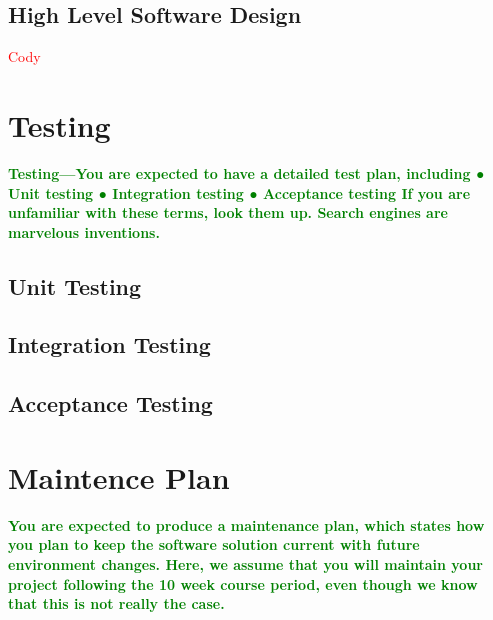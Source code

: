 \documentclass{article}
\numberwithin{equation}{section} %
\begin{document}
\subsection{High Level Software Design}
\textcolor{red}{Cody}

\section{Testing}
\textcolor{green}{\bf Testing—You are expected to have a detailed test plan, including 
● Unit testing
● Integration testing
● Acceptance testing
If you are unfamiliar with these terms, look them up. Search engines are marvelous 
inventions.}

\subsection{Unit Testing}

\subsection{Integration Testing}

\subsection{Acceptance Testing}

\section{Maintence Plan}
\textcolor{green}{\bf You are expected to produce a maintenance plan, which 
states how you plan to keep the software solution current with future environment 
changes. Here, we assume that you will maintain your project following the 10 
week course  period, even though we know that this is not really the case. }
\end{document}
